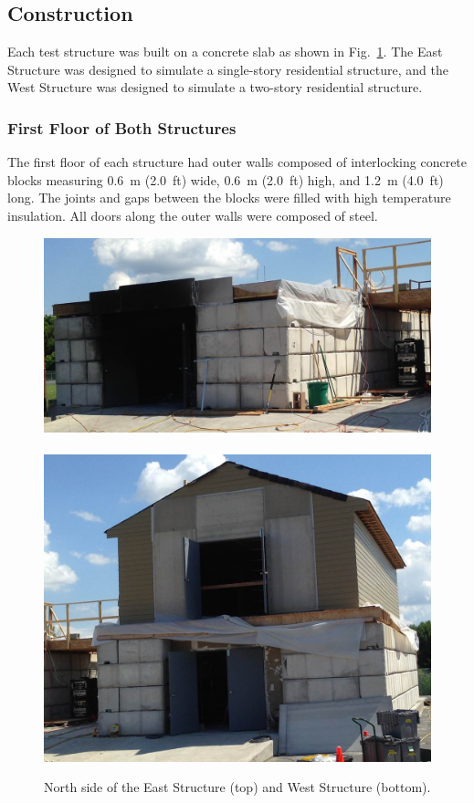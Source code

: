 \documentclass[12pt,oneside]{book}
\begin{document}
\subsection{Construction}
\label{sec:construction}
Each test structure was built on a concrete slab as shown in Fig.~\ref{fig:struct_pics}. The East Structure was designed to simulate a single-story residential structure, and the West Structure was designed to simulate a two-story residential structure.

\subsubsection{First Floor of Both Structures}
The first floor of each structure had outer walls composed of interlocking concrete blocks measuring 0.6~m (2.0~ft) wide, 0.6~m (2.0~ft) high, and 1.2~m (4.0~ft) long. The joints and gaps between the blocks were filled with high temperature insulation. All doors along the outer walls were composed of steel.

\begin{figure}[!ht]
	\includegraphics[width=5.25in]{../../Hose_Stream_Tests/Figures/Pictures/east_structure}
	\\~\\
	\includegraphics[width=5.25in]{../../Hose_Stream_Tests/Figures/Pictures/west_structure}
	\caption[North side of the East and West Structures.]{North side of the East Structure (top) and West Structure (bottom).}
	\label{fig:struct_pics}
\end{figure}
\end{document}
